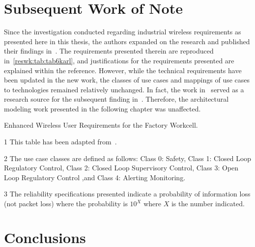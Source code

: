 	\section{Subsequent Work of Note}
	
	Since the investigation conducted regarding industrial wireless requirements as presented here in this thesis, the authors expanded on the research and published their findings in~\cite{Montgomery2019}.  The requirements presented therein are reproduced in~\ref{reswk:tab:tab6karl}, and justifications for the requirements presented are explained within the reference.  However, while the technical requirements have been updated in the new work, the classes of use cases and mappings of use cases to technologies remained relatively unchanged. In fact, the work in~\cite{CandellRW2017} served as a research source for the subsequent finding in~\cite{Montgomery2019}.  Therefore, the architectural modeling work presented in the following chapter was unaffected.
	
	
	
	\begin{table}[tbph!]
		\centering
		\caption{Enhanced Wireless User Requirements for the Factory Workcell.}\label{reswk:tab:tab6karl}
		\begin{threeparttable}[t]
		
		\vspace{3pt}
		\raggedright		
		\begin{tablenotes}
		\item[1] This table has been adapted from~\cite{Montgomery2019}. 
		\item[2] The use case classes are defined as follows: Class 0: Safety, Class 1: Closed Loop Regulatory Control, Class 2: Closed Loop Supervisory Control, Class 3: Open Loop Regulatory Control ,and Class 4: Alerting Monitoring.		
		\item[3] The reliability specifications presented indicate a probability of information loss (not packet loss) where the probability is $10^X$ where $X$ is the number indicated.
		\end{tablenotes}
		\end{threeparttable}
	\end{table}
	

    
	\section{Conclusions}\label{sec:conclusion}
    
